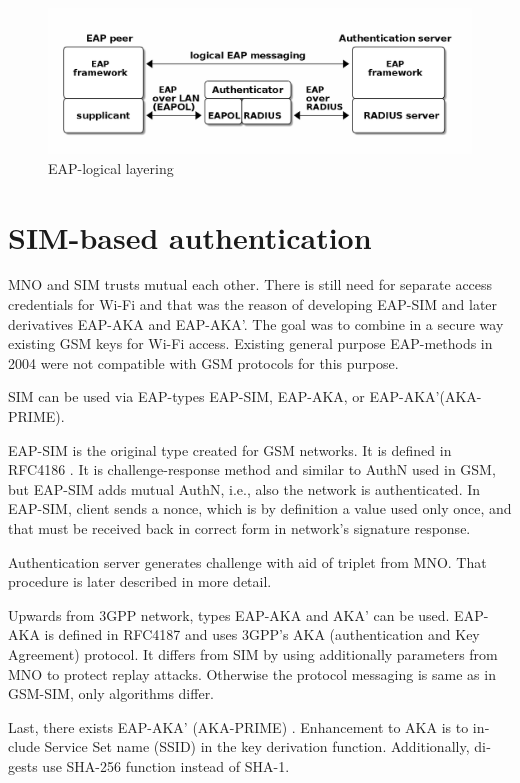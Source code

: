 \documentclass[12pt,a4paper,english]{tutthesis}
\begin{document}
\begin{otherlanguage}{english}
\begin{figure}[htb]
\centering
\includegraphics[width=.9\linewidth]{eap-layer.png}
\caption{\label{fig:eap-layers}EAP-logical layering}
\end{figure}






\section{SIM-based authentication}
\label{sec-2-5}
\label{sec:sim-based-auth}
MNO and SIM trusts mutual each other.
There is still need for separate access credentials for Wi-Fi and
that was the reason of developing EAP-SIM and later derivatives
EAP-AKA and EAP-AKA'.
The goal was to combine in a secure way existing GSM keys for Wi-Fi
access. Existing general purpose EAP-methods in 2004 were not
compatible with GSM protocols for this purpose. \cite[p.93]{hav-doc}


SIM can be used via EAP-types EAP-SIM,
EAP-AKA, or EAP-AKA'(AKA-PRIME).

EAP-SIM is the original type created for GSM networks. It is defined 
in RFC4186 \cite{rfc4186}.
It is challenge-response method and similar to AuthN used in GSM, 
but EAP-SIM adds mutual AuthN, i.e.,   also the network is authenticated.
In EAP-SIM, client sends a nonce, which is by definition a
value used only once, and that must be received back
in correct form in network's  signature response. 

Authentication server generates challenge with aid of
triplet from MNO.
That procedure is later described in more detail.

Upwards from 3GPP network, types EAP-AKA and AKA' can be used.
EAP-AKA is defined in RFC4187 \cite{rfc4187} and
 uses 3GPP's AKA (authentication and Key Agreement) protocol.
It differs from SIM by using additionally parameters from MNO to
protect replay attacks. Otherwise the protocol messaging is same
as in  GSM-SIM, only algorithms differ.


Last, there exists EAP-AKA' (AKA-PRIME) \cite{rfc5448}.
Enhancement to AKA is to include Service Set name (SSID) 
in the key derivation function. Additionally, digests use SHA-256
function instead of SHA-1.



\end{otherlanguage}
\end{document}
